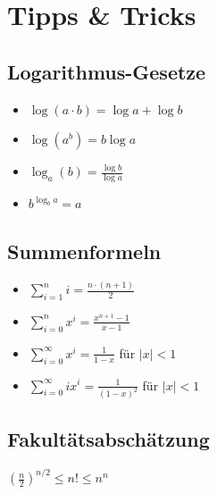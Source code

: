 \section*{Tipps \& Tricks}

\subsection*{Logarithmus-Gesetze}
\begin{itemize}
	\item $\log(a \cdot b) = \log a + \log b$
	\item $\log(a^b) = b \log a$
	\item $\log_a(b) = \frac{\log b}{\log a}$
	\item $b^{\log_b a} = a$
\end{itemize}

\subsection*{Summenformeln}
\begin{itemize}
	\item $\sum_{i=1}^n i = \frac{n\cdot(n+1)}{2}$
	\item $\sum_{i=0}^n x^i = \frac{x^{n+1} - 1}{x - 1}$
	\item $\sum_{i=0}^\infty x^i = \frac{1}{1-x}$ für $|x|<1$
	\item $\sum_{i=0}^\infty ix^i = \frac{1}{(1-x)^2}$ für $|x|<1$
\end{itemize}

\subsection*{Fakultätsabschätzung}
$\left(\frac{n}{2}\right)^{n/2} \le n! \le n^n$
